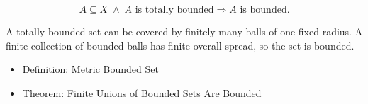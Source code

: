 \begin{remark*}
\[
A\subseteq X
\;\land\;
A\text{ is totally bounded}
\Longrightarrow
A\text{ is bounded}.
\]
\end{remark*}

\begin{remark*}[Interpretation]
A totally bounded set can be covered by finitely many balls of one fixed
radius.  A finite collection of bounded balls has finite overall spread, so
the set is bounded.
\end{remark*}

\begin{dependencies}
\begin{itemize}
  \item \hyperref[def:metric-bounded-set]{Definition: Metric Bounded Set}
  \item \hyperref[thm:metric-finite-unions-bounded-sets-bounded]{Theorem: Finite Unions of Bounded Sets Are Bounded}
\end{itemize}
\end{dependencies}
